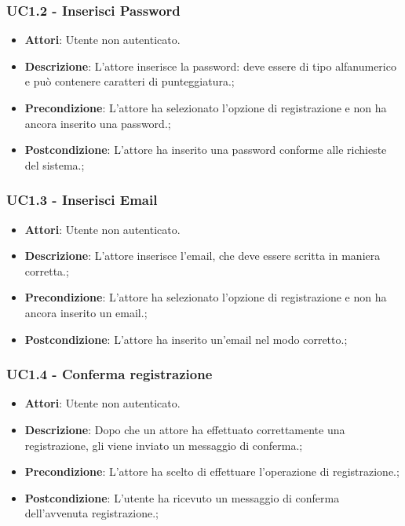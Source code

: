 \subsubsection{UC1.2 - Inserisci Password} 
\label{sssec:UC1.2} 
\begin{itemize} 
\item \textbf{Attori}: Utente non autenticato.
\item \textbf{Descrizione}: L’attore inserisce la password: deve essere di tipo alfanumerico e può contenere caratteri di punteggiatura.;
\item \textbf{Precondizione}: L'attore ha selezionato l'opzione di registrazione e non ha ancora inserito una password.;
\item \textbf{Postcondizione}: L'attore ha inserito una password conforme alle richieste del sistema.;
\end{itemize} 
\subsubsection{UC1.3 - Inserisci Email} 
\label{sssec:UC1.3} 
\begin{itemize} 
\item \textbf{Attori}: Utente non autenticato.
\item \textbf{Descrizione}: L’attore inserisce l'email, che deve essere scritta in maniera corretta.;
\item \textbf{Precondizione}: L'attore ha selezionato l'opzione di registrazione e non ha ancora inserito un email.;
\item \textbf{Postcondizione}: L'attore ha inserito un'email nel modo corretto.;
\end{itemize} 
\subsubsection{UC1.4 - Conferma registrazione} 
\label{sssec:UC1.4} 
\begin{itemize} 
\item \textbf{Attori}: Utente non autenticato.
\item \textbf{Descrizione}: Dopo che un attore ha effettuato correttamente una registrazione, gli viene inviato un messaggio di conferma.;
\item \textbf{Precondizione}: L'attore ha scelto di effettuare l'operazione di registrazione.;
\item \textbf{Postcondizione}: L'utente ha ricevuto un messaggio di conferma dell'avvenuta registrazione.;
\end{itemize} 
